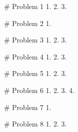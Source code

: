 # Problem 1
1. 
2. 
3.  


# Problem 2
1.


# Problem 3     
1. 
2.
3.  


# Problem 4
1.
2.
3.

# Problem 5
1. 
2. 
3. 

# Problem 6
1. 
2. 
3.
4.  

# Problem 7
1.

# Problem 8
1. 
2. 
3. 
